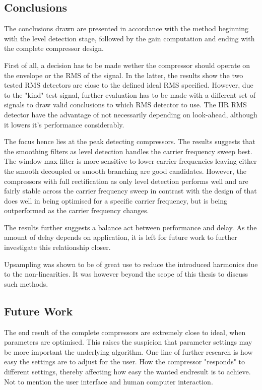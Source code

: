 \documentclass[../main2.tex]{subfiles}
\begin{document}
\subsection{Conclusions}\label{discussion_results}
The conclusions drawn are presented in accordance with the method beginning with the level detection stage, followed by the gain computation and ending with the complete compressor design.

First of all, a decision has to be made wether the compressor should operate on the envelope or the RMS of the signal. In the latter, the results show the two tested RMS detectors are close to the defined ideal RMS specified. However, due to the "kind" test signal, further evaluation has to be made with a different set of signals to draw valid conclusions to which RMS detector to use. The IIR RMS detector have the advantage of not necessarily depending on look-ahead, although it lowers it's performance considerably.

The focus  hence lies at the peak detecting compressors. The results suggests that the smoothing filters as level detection handles the carrier frequency sweep best. The window max filter is more sensitive to lower carrier frequencies leaving either the smooth decoupled or smooth branching are good candidates. However, the compressors with full rectification as only level detection performs well and are fairly stable across the carrier frequency sweep in contrast with the design of \cite{mcnally1984dynamic} that does well in being optimised for a specific carrier frequency, but is being outperformed as the carrier frequency changes.

The results further suggests a balance act between performance and delay. As the amount of delay depends on application, it is left for future work to further investigate this relationship closer.

Upsampling was shown to be of great use to reduce the introduced harmonics due to the non-linearities. It was however beyond the scope of this thesis to discuss such methods.

\subsection{Future Work}
The end result of the complete compressors are extremely close to ideal, when parameters are optimised. This raises the suspicion that parameter settings may be more important the underlying algorithm. One line of further research is how easy the settings are to adjust for the user. How the compressor "responds" to different settings, thereby affecting how easy the wanted endresult is to achieve. Not to mention the user interface and human computer interaction.
\end{document}
